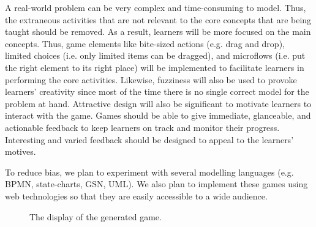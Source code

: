 \documentclass[12pt, a4paper]{report}
\begin{document}
A real-world problem can be very complex and time-consuming to model. Thus, the extraneous activities that are not relevant to the core concepts that are being taught should be removed. As a result, learners will be more focused on the main concepts. Thus, game elements like bite-sized actions (e.g. drag and drop), limited choices (i.e. only limited items can be dragged), and microflows (i.e. put the right element to its right place) will be implemented to facilitate learners in performing the core activities. Likewise, fuzziness will also be used to provoke learners' creativity since most of the time there is no single correct model for the problem at hand. Attractive design will also be significant to motivate learners to interact with the game. Games should be able to give immediate, glanceable, and actionable feedback to keep learners on track and monitor their progress. Interesting and varied feedback should be designed to appeal to the learners' motives. 

To reduce bias, we plan to experiment with several modelling languages (e.g. BPMN, state-charts, GSN, UML). We also plan to implement these games using web technologies so that they are easily accessible to a wide audience.

\begin{figure}[ht]
\centering
{}
\caption{The display of the generated game.}
\label{fig:001}
\end{figure}
\end{document}
